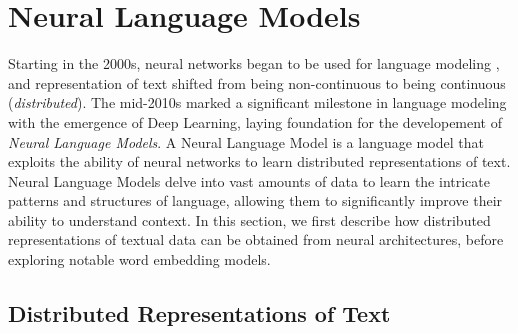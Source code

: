 \section{Neural Language Models}

Starting in the 2000s, neural networks began to be used for language modeling \citep{bengio2000neural}, and representation of text shifted from being non-continuous to being continuous (\textit{distributed}). The mid-2010s marked a significant milestone in language modeling with the emergence of Deep Learning, laying foundation for the developement of \textit{Neural Language Models}. A Neural Language Model is a language model that exploits the ability of neural networks to learn distributed representations of text. Neural Language Models delve into vast amounts of data to learn the intricate patterns and structures of language, allowing them to significantly improve their ability to understand context. In this section, we first describe how distributed representations of textual data can be obtained from neural architectures, before exploring notable word embedding models.




\subsection{Distributed Representations of Text}

